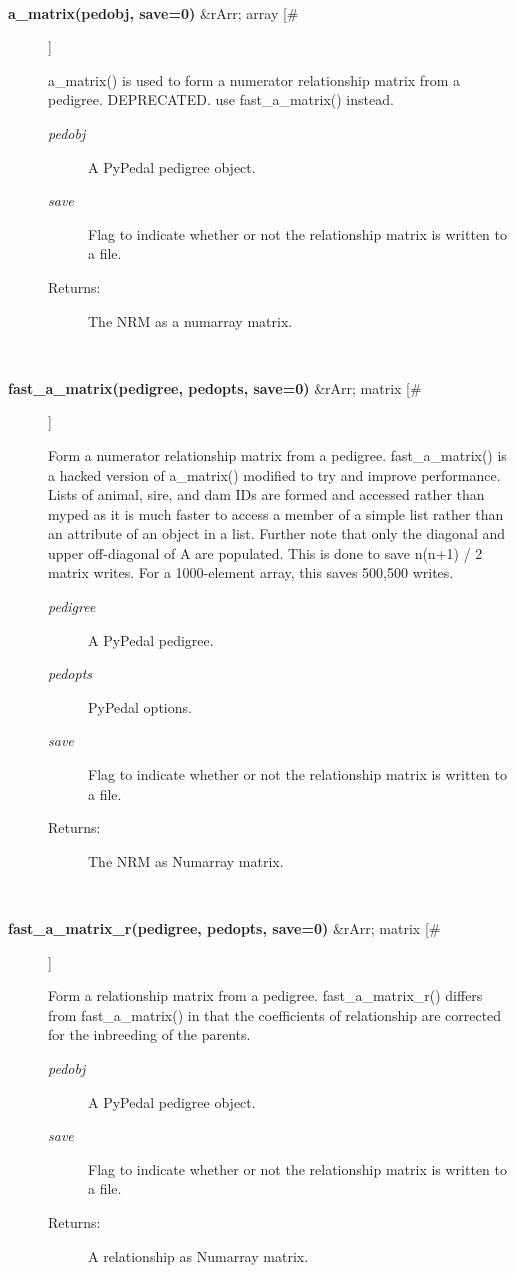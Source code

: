 \documentclass[10pt]{article}
\begin{document}
\begin{description}
\begin{description}
\end{description}
\\ 

\item[\textbf{a\_matrix(pedobj, save=0)}
 \&rArr; array [\#]]

 a\_matrix() is used to form a numerator relationship matrix from a pedigree. DEPRECATED. use fast\_a\_matrix() instead.
\begin{description}
\item[\emph{pedobj}
] A PyPedal pedigree object.
\item[\emph{save}
] Flag to indicate whether or not the relationship matrix is written to a file.
\item[Returns:] The NRM as a numarray matrix.

\end{description}
\\ 

\item[\textbf{fast\_a\_matrix(pedigree, pedopts, save=0)}
 \&rArr; matrix [\#]]

 Form a numerator relationship matrix from a pedigree. fast\_a\_matrix() is a hacked version of a\_matrix() modified to try and improve performance. Lists of animal, sire, and dam IDs are formed and accessed rather than myped as it is much faster to access a member of a simple list rather than an attribute of an object in a list. Further note that only the diagonal and upper off-diagonal of A are populated. This is done to save n(n+1) / 2 matrix writes. For a 1000-element array, this saves 500,500 writes.
\begin{description}
\item[\emph{pedigree}
] A PyPedal pedigree.
\item[\emph{pedopts}
] PyPedal options.
\item[\emph{save}
] Flag to indicate whether or not the relationship matrix is written to a file.
\item[Returns:] The NRM as Numarray matrix.

\end{description}
\\ 

\item[\textbf{fast\_a\_matrix\_r(pedigree, pedopts, save=0)}
 \&rArr; matrix [\#]]

 Form a relationship matrix from a pedigree. fast\_a\_matrix\_r() differs from fast\_a\_matrix() in that the coefficients of relationship are corrected for the inbreeding of the parents.
\begin{description}
\item[\emph{pedobj}
] A PyPedal pedigree object.
\item[\emph{save}
] Flag to indicate whether or not the relationship matrix is written to a file.
\item[Returns:] A relationship as Numarray matrix.


\end{description}
\end{description}
\end{document}
